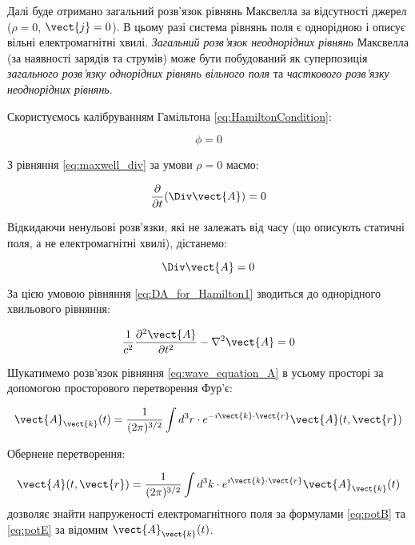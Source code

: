 Далі буде отримано загальний розв’язок рівнянь Максвелла за відсутності джерел (\(\rho = 0\), \(\vect{j} = 0\)). В цьому разі система рівнянь поля є
однорідною і описує вільні електромагнітні хвилі. \textit{Загальний розв’язок} \textit{неоднорідних рівнянь} Максвелла (за наявності зарядів та струмів)
може бути побудований як суперпозиція \textit{загального розв’язку однорідних рівнянь вільного поля} та \textit{часткового розв’язку неоднорідних
рівнянь}.

Скористуємось калібруванням Гамільтона \eqref{eq:HamiltonCondition}:

\begin{equation}
\phi = 0
\label{eq:phi_zero}
\end{equation}

З рівняння \eqref{eq:maxwell_div} за умови \(\rho = 0\) маємо:

\begin{equation*}
\frac{\partial}{\partial t} (\Div\vect{A}) = 0
\end{equation*}

Відкидаючи ненульові розв’язки, які не залежать від часу (що описують статичні поля, а не електромагнітні хвилі), дістанемо:

\begin{equation}
\Div\vect{A} = 0
\label{eq:div_A_zero}
\end{equation}

За цією умовою рівняння \eqref{eq:DA_for_Hamilton1} зводиться до однорідного хвильового рівняння:

\begin{equation}
\frac{1}{c^2} \frac{\partial^2 \vect{A}}{\partial t^2} - \nabla^2 \vect{A} = 0
\label{eq:wave_equation_A}
\end{equation}

Шукатимемо розв’язок рівняння \eqref{eq:wave_equation_A} в усьому просторі за допомогою просторового перетворення Фур’є:

\begin{equation}
\vect{A}_{\vect{k}}(t) = \frac{1}{(2\pi)^{3/2}} \int d^3r \cdot e^{-i\vect{k} \cdot \vect{r}} \vect{A}(t, \vect{r})
\label{eq:fourier_transform_A}
\end{equation}

Обернене перетворення:

\begin{equation}
\vect{A}(t, \vect{r}) = \frac{1}{(2\pi)^{3/2}} \int d^3k \cdot e^{i\vect{k} \cdot \vect{r}} \vect{A}_{\vect{k}}(t)
\label{eq:inverse_fourier_transform_A}
\end{equation}
дозволяє знайти напруженості електромагнітного поля за формулами \eqref{eq:potB} та \eqref{eq:potE} за відомим \(\vect{A}_{\vect{k}}(t)\).

